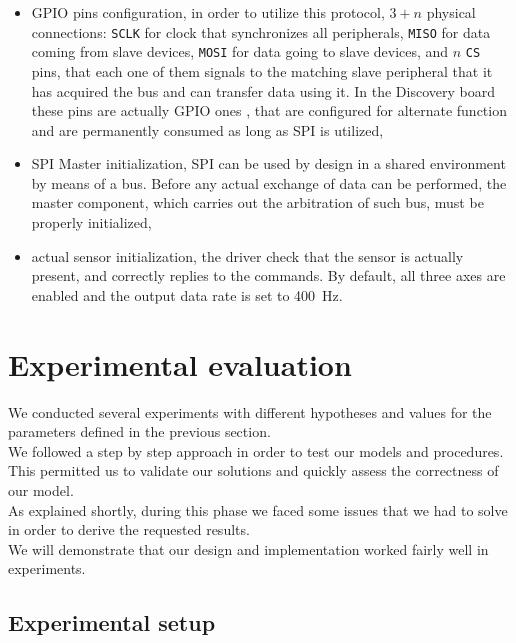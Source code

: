 \begin{itemize}
	\item GPIO pins configuration, in order to utilize this protocol, $3 + n$ physical connections: \texttt{SCLK} for clock that synchronizes all peripherals, \texttt{MISO} for data coming from slave devices, \texttt{MOSI} for data going to slave devices, and $n$ \texttt{CS} pins, that each one of them signals to the matching slave peripheral that it has acquired the bus and can transfer data using it. In the Discovery board these pins are actually GPIO ones \cite{STM32F4RefMan}, that are configured for alternate function and are permanently consumed as long as SPI is utilized,
	\item SPI Master initialization, SPI can be used by design in a shared environment by means of a bus. Before any actual exchange of data can be performed, the master component, which carries out the arbitration of such bus, must be properly initialized,
	\item actual sensor initialization, the driver check that the sensor is actually present, and correctly replies to the commands. By default, all three axes are enabled and the output data rate is set to \SI{400}{\Hz}.
\end{itemize}

\section{Experimental evaluation}
We conducted several experiments with different hypotheses and values for the parameters defined in the previous section. \\
We followed a step by step approach in order to test our models and procedures. This permitted us to validate our solutions and quickly assess the correctness of our model. \\
As explained shortly, during this phase we faced some issues that we had to solve in order to derive the requested results. \\
We will demonstrate that our design and implementation worked fairly well in experiments.
\subsection{Experimental setup}

